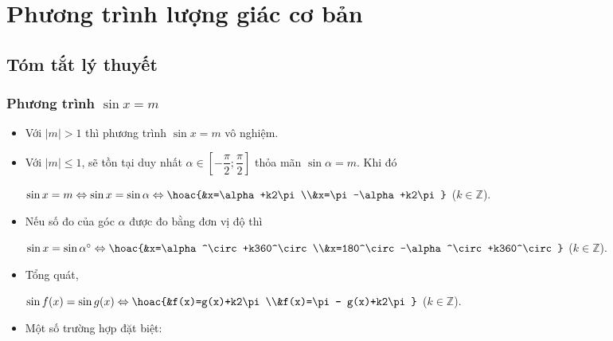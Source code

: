 
\setcounter{section}{3}
\section{Phương trình lượng giác cơ bản}
\subsection{Tóm tắt lý thuyết}
\begin{tomtat}
\subsubsection{Phương trình $\sin x=m$}
\begin{itemize}
	\item Với $|m|>1$ thì phương trình $\sin x=m$ vô nghiệm.
	\item Với $|m|\leq 1$, sẽ tồn tại duy nhất $\alpha \in \left[-\dfrac{\pi}{2}; \dfrac{\pi}{2}\right]$ thỏa mãn $\sin\alpha=m$. Khi đó
	\begin{center}
		$\sin x=m\Leftrightarrow\sin x=\sin\alpha\Leftrightarrow\hoac{&x=\alpha+k2\pi\\&x=\pi-\alpha+k2\pi}$ ($k\in \mathbb{Z}$).
	\end{center}
\item Nếu số đo của góc $\alpha$ được đo bằng đơn vị độ thì
\begin{center}
	$\sin x=\sin\alpha^\circ\Leftrightarrow\hoac{&x=\alpha^\circ+k360^\circ\\&x=180^\circ-\alpha^\circ+k360^\circ}$ ($k\in\mathbb{Z}$).
\end{center}
\item Tổng quát,
\begin{center}
	$\sin f(x)=\sin g(x)\Leftrightarrow\hoac{&f(x)=g(x)+k2\pi\\&f(x)=\pi - g(x)+k2\pi}$ ($k\in\mathbb{Z}$).
\end{center}
\item Một số trường hợp đặt biệt:
\end{itemize}

\end{tomtat}
